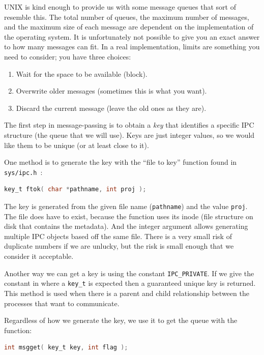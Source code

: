 UNIX is kind enough to provide us with some message queues that sort of resemble this. The total number of queues, the maximum number of messages, and the maximum size of each message are dependent on the implementation of the operating system. It is unfortunately not possible to give you an exact answer to how many messages can fit. In a real implementation, limits are something you need to consider; you have three choices:

\begin{enumerate}
       \item Wait for the space to be available (block).
       \item Overwrite older messages (sometimes this is what you want).
       \item Discard the current message (leave the old ones as they are).
\end{enumerate}

The first step in message-passing is to obtain a \textit{key} that identifies a specific IPC structure (the queue that we will use). Keys are just integer values, so we would like them to be unique (or at least close to it).

One method is to generate the key with the ``file to key'' function found in \texttt{sys/ipc.h}~\cite{lpi}:
\begin{lstlisting}[language=C]
key_t ftok( char *pathname, int proj );
\end{lstlisting}
 
The key is generated from the given file name (\texttt{pathname}) and the value \texttt{proj}. The file does have to exist, because the function uses its inode (file structure on disk that contains the metadata). And the integer argument allows generating multiple IPC objects based off the same file. There is a very small risk of duplicate numbers if we are unlucky, but the risk is small enough that we consider it acceptable.

Another way we can get a key is using the constant \texttt{IPC\_PRIVATE}. If we give the constant in where a \texttt{key\_t} is expected then a guaranteed unique key is returned. This method is used when there is a parent and child relationship between the processes that want to communicate.

Regardless of how we generate the key, we use it to get the queue with the function:
\begin{lstlisting}[language=C]
int msgget( key_t key, int flag );
\end{lstlisting}
 
